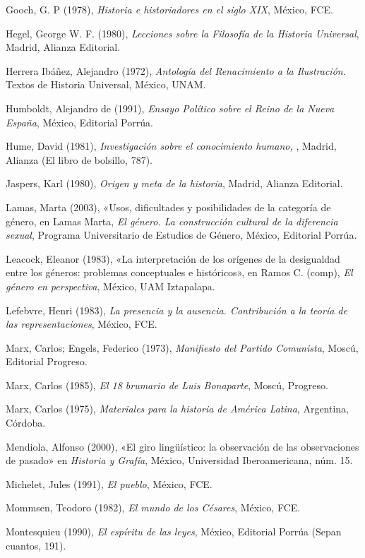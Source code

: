 Gooch, G. P (1978), \textit{Historia e historiadores en el siglo XIX}, México,
FCE\@.


Hegel, George W. F. (1980), \textit{Lecciones sobre la Filosofía de la Historia
Universal}, Madrid, Alianza Editorial. 


Herrera Ibáñez, Alejandro (1972), \textit{Antología del Renacimiento a la
Ilustración}. Textos de Historia Universal, México, UNAM\@. 


Humboldt, Alejandro de (1991), \textit{Ensayo Político sobre el Reino de la
Nueva España}, México, Editorial Porrúa. 


Hume, David (1981), \textit{Investigación sobre el conocimiento humano,
}, Madrid, Alianza (El libro de bolsillo, 787). 


Jaspers, Karl (1980), \textit{Origen y meta de la historia}, Madrid, Alianza Editorial. 


Lamas, Marta (2003), «Usos, dificultades y posibilidades de la categoría de
género, en Lamas Marta, \textit{El género. La construcción cultural de la
diferencia sexual}, Programa Universitario de Estudios de Género, México,
Editorial Porrúa.


Leacock, Eleanor (1983), «La interpretación de los orígenes de la desigualdad
entre los géneros: problemas conceptuales e históricos», en Ramos C.
(comp), \textit{El género en perspectiva}, México, UAM Iztapalapa. 

Lefebvre, Henri (1983), \textit{La presencia y la ausencia. Contribución a la
teoría de las representaciones}, México, FCE. 


Marx, Carlos; Engels, Federico (1973), \textit{Manifiesto del Partido
Comunista}, Moscú, Editorial Progreso. 


Marx, Carlos (1985), \textit{El 18 brumario de Luis Bonaparte}, Moscú,
Progreso.

 
Marx, Carlos (1975), \textit{Materiales para la historia de América Latina},
Argentina, Córdoba. 


Mendiola, Alfonso (2000), «El giro lingüístico: la observación de las
observaciones de pasado» en {\itshape Historia y Grafía}, México, Universidad
Iberoamericana, núm. 15. 


Michelet, Jules (1991), \textit{El pueblo}, México, FCE\@. 


Mommsen, Teodoro (1982), \textit{El mundo de los Césares}, México, FCE\@. 


Montesquieu (1990), \textit{El espíritu de las leyes}, México, Editorial Porrúa
(Sepan cuantos, 191).


